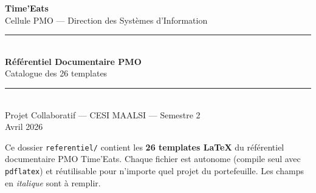 \documentclass[11pt,a4paper,oneside]{report}
\begin{document}
\small

\begin{titlepage}
  \pagecolor{cnNavy}\color{white}
  \vspace*{3cm}
  \begin{center}
    {\Huge\bfseries Time'Eats}\\[0.5cm]
    {\normalsize\textcolor{cnSlate} Cellule PMO — Direction des Systèmes d'Information}\\[2cm]
    \textcolor{cnOrange}{\rule{12cm}{1.5pt}}\\[1cm]
    {\LARGE\bfseries Référentiel Documentaire PMO}\\[0.5cm]
    {\large Catalogue des 26 templates}\\[1cm]
    \textcolor{cnOrange}{\rule{12cm}{1.5pt}}\\[2cm]
    {\normalsize Projet Collaboratif — CESI MAALSI — Semestre 2}\\[0.3cm]
    {\normalsize Avril 2026}
  \end{center}
\end{titlepage}
\nopagecolor

\begin{finding}
Ce dossier \texttt{referentiel/} contient les \textbf{26 templates LaTeX} du référentiel documentaire PMO Time'Eats. Chaque fichier est autonome (compile seul avec \texttt{pdflatex}) et réutilisable pour n'importe quel projet du portefeuille. Les champs en \textit{italique} sont à remplir.
\end{finding}

\vspace{6pt}
\end{document}
